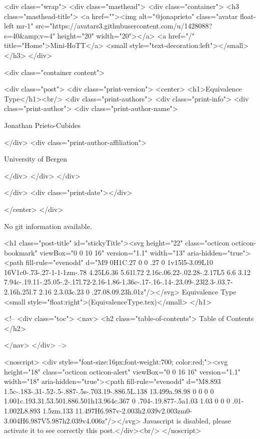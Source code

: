     <div class="wrap">
      <div class="masthead">
        <div class="container">
          <h3 class="masthead-title">
            <a href=""><img alt="@jonaprieto" class="avatar float-left mr-1" src="https://avatars3.githubusercontent.com/u/1428088?s=40&amp;v=4" height="20" width="20"></a>
            <a href="/" title="Home">Mini-HoTT</a>
            <small style="text-decoration:left"></small>
          </h3>
        </div>
      
      <div class="container content">
        







<div class="post">
  <div class="print-version">
    <center>
      <h1>Equivalence Type</h1><br/>
        <div class="print-authors">
          <div class="print-info">
            <div class="print-author">
              <div class="print-author-name">
                
                  Jonathan Prieto-Cubides
                
              </div>
              <div class="print-author-affiliation">
                
                  University of Bergen
                
                </div>
            </div>
          </div>
          
          
        </div>
        <div class="print-date"></div>
        
        
    </center>
  </div>

  
  No git information available.
  

  <h1 class="post-title" id="stickyTitle"><svg height="22" class="octicon octicon-bookmark" viewBox="0 0 10 16" version="1.1" width="13" aria-hidden="true"><path fill-rule="evenodd" d="M9 0H1C.27 0 0 .27 0 1v15l5-3.09L10 16V1c0-.73-.27-1-1-1zm-.78 4.25L6.36 5.61l.72 2.16c.06.22-.02.28-.2.17L5 6.6 3.12 7.94c-.19.11-.25.05-.2-.17l.72-2.16-1.86-1.36c-.17-.16-.14-.23.09-.23l2.3-.03.7-2.16h.25l.7 2.16 2.3.03c.23 0 .27.08.09.23h.01z"/></svg> Equivalence Type <small style="float:right">(EquivalenceType.tex)</small>
  </h1>

  <!-- 
  <div class="toc">
    <nav>
    <h2 class="table-of-contents"> Table of Contents </h2>
      

    </nav>
  </div>
   -->

  <noscript>
  <div style="font-size:16px;font-weight:700; color:red;"><svg height="18" class="octicon octicon-alert" viewBox="0 0 16 16" version="1.1" width="18" aria-hidden="true"><path fill-rule="evenodd" d="M8.893 1.5c-.183-.31-.52-.5-.887-.5s-.703.19-.886.5L.138 13.499a.98.98 0 0 0 0 1.001c.193.31.53.501.886.501h13.964c.367 0 .704-.19.877-.5a1.03 1.03 0 0 0 .01-1.002L8.893 1.5zm.133 11.497H6.987v-2.003h2.039v2.003zm0-3.004H6.987V5.987h2.039v4.006z"/></svg> Javascript is disabled, please activate it to see correctly this post.</div><br/>
  </noscript>

